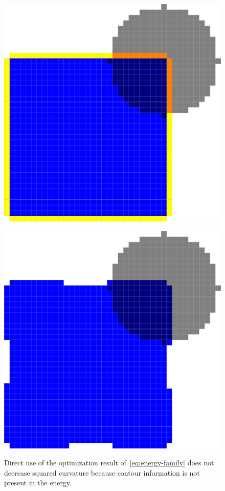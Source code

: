 \begin{figure}
\begin{minipage}{0.49\textwidth}
\center
\includegraphics[scale=0.15]{figures/chapter6/contour-information/before-opt.pdf}
\label{fig:contour-info-1}
\end{minipage}%
\begin{minipage}{0.49\textwidth}
\center
\includegraphics[scale=0.15]{figures/chapter6/contour-information/after-opt.pdf}
\label{fig:contour-info-2}
\end{minipage}%
\caption{ Direct use of the optimization result of~\cref{eq:energy-family} does not decrease squared curvature because contour information is not present in the energy.}
\label{fig:contour-info}
\end{figure}

